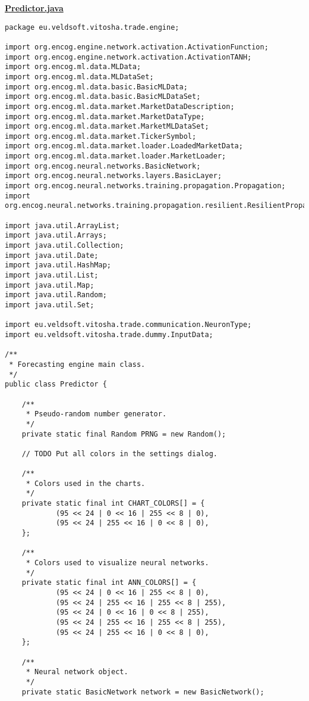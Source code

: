 \textbf{\underline{Predictor.java}}
\begin{verbatim}
package eu.veldsoft.vitosha.trade.engine;

import org.encog.engine.network.activation.ActivationFunction;
import org.encog.engine.network.activation.ActivationTANH;
import org.encog.ml.data.MLData;
import org.encog.ml.data.MLDataSet;
import org.encog.ml.data.basic.BasicMLData;
import org.encog.ml.data.basic.BasicMLDataSet;
import org.encog.ml.data.market.MarketDataDescription;
import org.encog.ml.data.market.MarketDataType;
import org.encog.ml.data.market.MarketMLDataSet;
import org.encog.ml.data.market.TickerSymbol;
import org.encog.ml.data.market.loader.LoadedMarketData;
import org.encog.ml.data.market.loader.MarketLoader;
import org.encog.neural.networks.BasicNetwork;
import org.encog.neural.networks.layers.BasicLayer;
import org.encog.neural.networks.training.propagation.Propagation;
import org.encog.neural.networks.training.propagation.resilient.ResilientPropagation;

import java.util.ArrayList;
import java.util.Arrays;
import java.util.Collection;
import java.util.Date;
import java.util.HashMap;
import java.util.List;
import java.util.Map;
import java.util.Random;
import java.util.Set;

import eu.veldsoft.vitosha.trade.communication.NeuronType;
import eu.veldsoft.vitosha.trade.dummy.InputData;

/**
 * Forecasting engine main class.
 */
public class Predictor {

    /**
     * Pseudo-random number generator.
     */
    private static final Random PRNG = new Random();

    // TODO Put all colors in the settings dialog.

    /**
     * Colors used in the charts.
     */
    private static final int CHART_COLORS[] = {
            (95 << 24 | 0 << 16 | 255 << 8 | 0),
            (95 << 24 | 255 << 16 | 0 << 8 | 0),
    };

    /**
     * Colors used to visualize neural networks.
     */
    private static final int ANN_COLORS[] = {
            (95 << 24 | 0 << 16 | 255 << 8 | 0),
            (95 << 24 | 255 << 16 | 255 << 8 | 255),
            (95 << 24 | 0 << 16 | 0 << 8 | 255),
            (95 << 24 | 255 << 16 | 255 << 8 | 255),
            (95 << 24 | 255 << 16 | 0 << 8 | 0),
    };

    /**
     * Neural network object.
     */
    private static BasicNetwork network = new BasicNetwork();


\end{verbatim}
